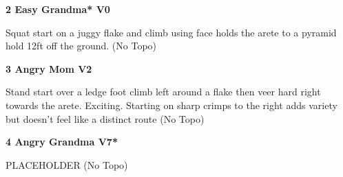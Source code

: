 \begin{multicols}{2}
					\begin{minipage}{\linewidth}	
					\label{rt:Easy Grandma}
\colorbox{green!20}{
\parbox{0.95\textwidth}{
\textbf{
2 Easy Grandma* V0   
}
}
}

					\begin{adjustwidth}{0.5cm}{}				
					Squat start on a juggy flake and climb using face holds the arete to a pyramid hold 12ft off the ground.
						\newline (No Topo) 
					\end{adjustwidth}
					\end{minipage}
					\begin{minipage}{\linewidth}	
					\label{rt:Angry Mom}
\colorbox{green!20}{
\parbox{0.95\textwidth}{
\textbf{
3 Angry Mom V2    \warn 
}
}
}

					\begin{adjustwidth}{0.5cm}{}				
					Stand start over a ledge foot climb left around a flake then veer hard right towards the arete. Exciting. Starting on sharp crimps to the right adds variety but doesn't feel like a distinct route
						\newline (No Topo) 
					\end{adjustwidth}
					\end{minipage}
					\begin{minipage}{\linewidth}	
					\label{rt:Angry Grandma}
\colorbox{Goldenrod!50}{
\parbox{0.95\textwidth}{
\textbf{
4 Angry Grandma V7*  
}
}
}

					\begin{adjustwidth}{0.5cm}{}				
					PLACEHOLDER
						\newline (No Topo) 
					\end{adjustwidth}
					\end{minipage}
\end{multicols}
\clearpage